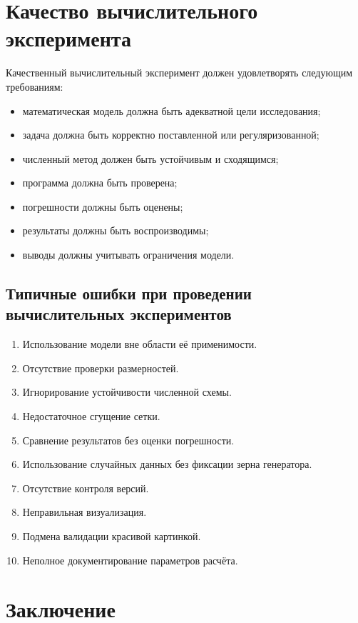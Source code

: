 \documentclass[12pt,a4paper]{article}
\theoremstyle{definition}
\theoremstyle{plain}
\begin{document}
\section{Качество вычислительного эксперимента}

Качественный вычислительный эксперимент должен удовлетворять следующим требованиям:
\begin{itemize}
    \item математическая модель должна быть адекватной цели исследования;
    \item задача должна быть корректно поставленной или регуляризованной;
    \item численный метод должен быть устойчивым и сходящимся;
    \item программа должна быть проверена;
    \item погрешности должны быть оценены;
    \item результаты должны быть воспроизводимы;
    \item выводы должны учитывать ограничения модели.
\end{itemize}

\subsection{Типичные ошибки при проведении вычислительных экспериментов}

\begin{enumerate}
    \item Использование модели вне области её применимости.
    \item Отсутствие проверки размерностей.
    \item Игнорирование устойчивости численной схемы.
    \item Недостаточное сгущение сетки.
    \item Сравнение результатов без оценки погрешности.
    \item Использование случайных данных без фиксации зерна генератора.
    \item Отсутствие контроля версий.
    \item Неправильная визуализация.
    \item Подмена валидации красивой картинкой.
    \item Неполное документирование параметров расчёта.
\end{enumerate}

\section{Заключение}
\end{document}
